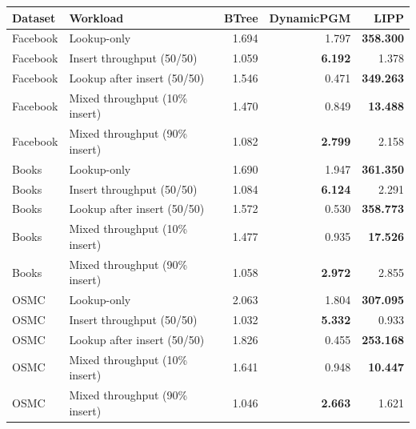 \begin{tabular}{llrrr}
\toprule
Dataset & Workload & BTree & DynamicPGM & LIPP \\
\midrule
Facebook & Lookup-only & 1.694 & 1.797 & \textbf{358.300} \\
Facebook & Insert throughput (50/50) & 1.059 & \textbf{6.192} & 1.378 \\
Facebook & Lookup after insert (50/50) & 1.546 & 0.471 & \textbf{349.263} \\
Facebook & Mixed throughput (10\% insert) & 1.470 & 0.849 & \textbf{13.488} \\
Facebook & Mixed throughput (90\% insert) & 1.082 & \textbf{2.799} & 2.158 \\
\midrule
Books & Lookup-only & 1.690 & 1.947 & \textbf{361.350} \\
Books & Insert throughput (50/50) & 1.084 & \textbf{6.124} & 2.291 \\
Books & Lookup after insert (50/50) & 1.572 & 0.530 & \textbf{358.773} \\
Books & Mixed throughput (10\% insert) & 1.477 & 0.935 & \textbf{17.526} \\
Books & Mixed throughput (90\% insert) & 1.058 & \textbf{2.972} & 2.855 \\
\midrule
OSMC & Lookup-only & 2.063 & 1.804 & \textbf{307.095} \\
OSMC & Insert throughput (50/50) & 1.032 & \textbf{5.332} & 0.933 \\
OSMC & Lookup after insert (50/50) & 1.826 & 0.455 & \textbf{253.168} \\
OSMC & Mixed throughput (10\% insert) & 1.641 & 0.948 & \textbf{10.447} \\
OSMC & Mixed throughput (90\% insert) & 1.046 & \textbf{2.663} & 1.621 \\
\bottomrule
\end{tabular}
